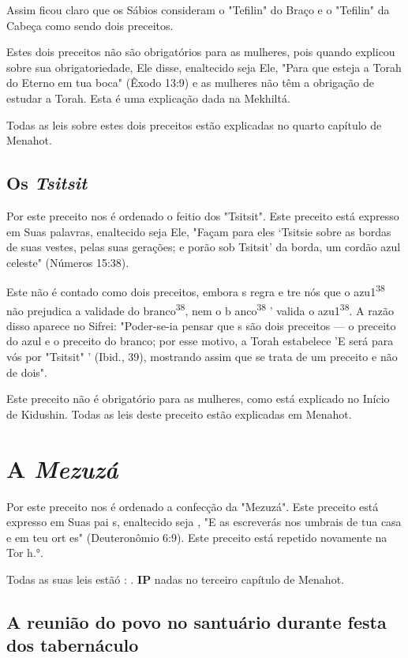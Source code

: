 \begin{itemize}
\begin{enumrate}
\begin{itemize}
\begin{itemize}
Assim ficou claro que os Sábios consideram o "Tefilin" do Braço e o
"Tefilin" da Cabeça como sendo dois preceitos.

Estes dois preceitos não são obrigatórios para as mulheres, pois quan­do
explicou sobre sua obrigatoriedade, Ele disse, enaltecido seja Ele,
"Para que esteja a Torah do Eterno em tua boca" (Êxodo 13:9) e as
mulheres não têm a obrigação de estudar a Torah. Esta é uma explicação
dada na Mekhiltá.

Todas as leis sobre estes dois preceitos estão explicadas no quarto
capítulo de Menahot.

\section{Os \emph{Tsitsit}}

Por este preceito nos é ordenado o feitio dos "Tsitsit". Este precei­to
está expresso em Suas palavras, enaltecido seja Ele, "Façam para eles
`Tsitsie sobre as bordas de suas vestes, pelas suas gerações; e porão
sob Tsitsit' da borda, um cordão azul celeste" (Números 15:38).

Este não é contado como dois preceitos, embora s regra e tre nós que o
azu1\textsuperscript{38} não prejudica a validade do
branco\textsuperscript{38}, nem o b anco\textsuperscript{38} ' valida o
azu1\textsuperscript{38}. A razão disso aparece no Sifrei: "Poder-se-ia
pensar que s são dois preceitos --- o preceito do azul e o preceito do
branco; por esse motivo, a To­rah estabelece 'E será para vós por
"Tsitsit" ' (Ibid., 39), mostrando assim que se trata de um preceito e
não de dois".

Este preceito não é obrigatório para as mulheres, como está explicado no
Início de Kidushin. Todas as leis deste preceito estão explicadas em
Menahot.

\chapter{A \emph{Mezuzá}}

Por este preceito nos é ordenado a confecção da "Mezuzá". Este
preceito está expresso em Suas pai s, enaltecido seja , "E as escreverás
nos umbrais de tua casa e em teu ort es" (Deuteronômio 6:9). Este
preceito está repetido novamente na Tor h.°.


Todas as suas leis estãó : . \textbf{IP} nadas no terceiro capítulo de
Menahot.



\section{A reunião do povo no santuário durante festa dos tabernáculo}


\end{itemize}
\end{itemize}
\end{enumrate}
\end{itemize}
